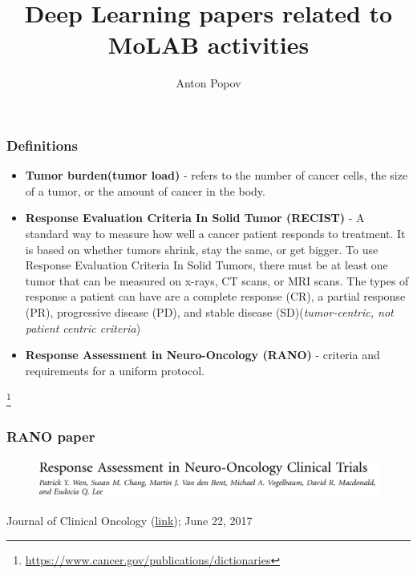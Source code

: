 \documentclass{beamer}
\title{Deep Learning papers related to MoLAB activities}
\author{Anton Popov}
\institute{UCLM, MoLAB, Spain, Ciudad Real}
\begin{document}
	
\begin{frame}
\titlepage
\end{frame}


\begin{frame}
\frametitle{Definitions}
\begin{itemize}
	\item \textbf{Tumor burden(tumor load)} - refers to the number of cancer cells, the size of a tumor, or the amount of cancer in the body.
	
	\item \textbf{Response Evaluation Criteria In Solid Tumor (RECIST)} - A standard way to measure how well a cancer patient responds to treatment. It is based on whether tumors shrink, stay the same, or get bigger. To use Response Evaluation Criteria In Solid Tumors, there must be at least one tumor that can be measured on x-rays, CT scans, or MRI scans. The types of response a patient can have are a complete response (CR), a partial response (PR), progressive disease (PD), and stable disease (SD){\color{gray}(\textit{tumor-centric, not patient centric criteria})}
	
	\item \textbf{Response Assessment in Neuro-Oncology (RANO)} - criteria and requirements for a uniform protocol.
\end{itemize}
\footnote{\url{https://www.cancer.gov/publications/dictionaries}}
\end{frame}



\begin{frame}
\frametitle{RANO paper}
\begin{figure}
	\centering
	\includegraphics[width=1.0\textwidth]{images/paper_rano_name.png}
\end{figure}
Journal of Clinical Oncology (\href{https://www.ncbi.nlm.nih.gov/pmc/articles/PMC5516482/pdf/JCO.2017.72.7511.pdf}{{\color{blue}\underline{link}}}); June 22, 2017
\end{frame}
\end{document}
